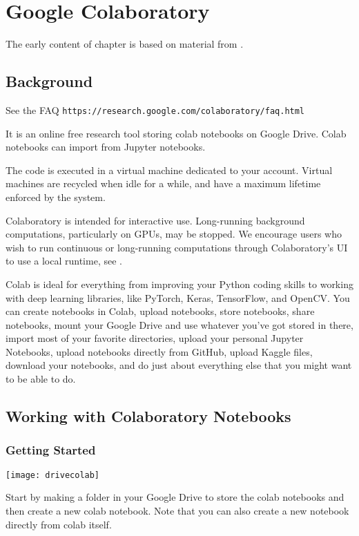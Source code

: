
\chapter{Google Colaboratory}
\label{sec:Google Colaboratory}

The early content of chapter is based on material from  \cite{LiuCoLab2019,AnneBonner2019}.
\section{Background}

See the FAQ
\lstinline{https://research.google.com/colaboratory/faq.html}

It is an online  free research tool storing colab notebooks on Google Drive. Colab notebooks can import from Jupyter notebooks.

The code is executed in a virtual machine dedicated to your account. Virtual machines are recycled when idle for a while, and have a maximum lifetime enforced by the system. 

Colaboratory is intended for interactive use. Long-running background computations, particularly on GPUs, may be stopped. We encourage users who wish to run continuous or long-running computations through Colaboratory’s UI to use a local runtime, see \cite{googleLcalColabs2019}.

Colab is ideal for everything from improving your Python coding skills to working with deep learning libraries, like PyTorch, Keras, TensorFlow, and OpenCV. You can create notebooks in Colab, upload notebooks, store notebooks, share notebooks, mount your Google Drive and use whatever you’ve got stored in there, import most of your favorite directories, upload your personal Jupyter Notebooks, upload notebooks directly from GitHub, upload Kaggle files, download your notebooks, and do just about everything else that you might want to be able to do.

\section{Working with Colaboratory Notebooks}
\subsection{Getting Started}
\begin{marginfigure}
\texttt{[image: drivecolab]}
\end{marginfigure}
Start by making a folder in your Google Drive to store the colab notebooks and then create a new colab notebook. Note that you can also create a new notebook directly from colab itself.

